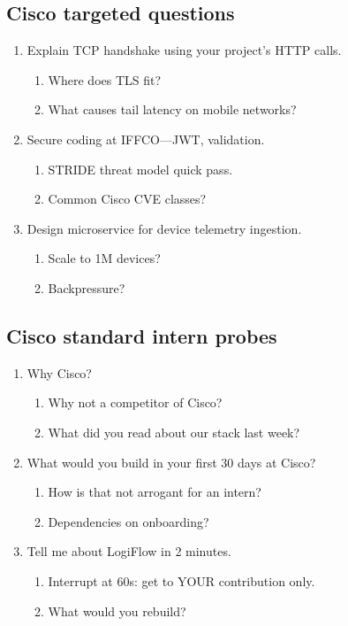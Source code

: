 \documentclass[9pt,a4paper]{article}
\begin{document}
\subsection{Cisco targeted questions}
\begin{enumerate}[label=\textbf{Q\arabic*:}, leftmargin=*]
  \item Explain TCP handshake using your project's HTTP calls.
  \begin{enumerate}[label=\textit{FU\arabic*:}, leftmargin=2em]
    \item Where does TLS fit?
    \item What causes tail latency on mobile networks?
  \end{enumerate}
  \item Secure coding at IFFCO---JWT, validation.
  \begin{enumerate}[label=\textit{FU\arabic*:}, leftmargin=2em]
    \item STRIDE threat model quick pass.
    \item Common Cisco CVE classes?
  \end{enumerate}
  \item Design microservice for device telemetry ingestion.
  \begin{enumerate}[label=\textit{FU\arabic*:}, leftmargin=2em]
    \item Scale to 1M devices?
    \item Backpressure?
  \end{enumerate}
\end{enumerate}
\subsection{Cisco standard intern probes}
\begin{enumerate}[label=\textbf{Q\arabic*:}, leftmargin=*]
  \item Why Cisco?
  \begin{enumerate}[label=\textit{FU\arabic*:}, leftmargin=2em]
    \item Why not a competitor of Cisco?
    \item What did you read about our stack last week?
  \end{enumerate}
  \item What would you build in your first 30 days at Cisco?
  \begin{enumerate}[label=\textit{FU\arabic*:}, leftmargin=2em]
    \item How is that not arrogant for an intern?
    \item Dependencies on onboarding?
  \end{enumerate}
  \item Tell me about LogiFlow in 2 minutes.
  \begin{enumerate}[label=\textit{FU\arabic*:}, leftmargin=2em]
    \item Interrupt at 60s: get to YOUR contribution only.
    \item What would you rebuild?
  \end{enumerate}
\end{enumerate}
\newpage
\end{document}
